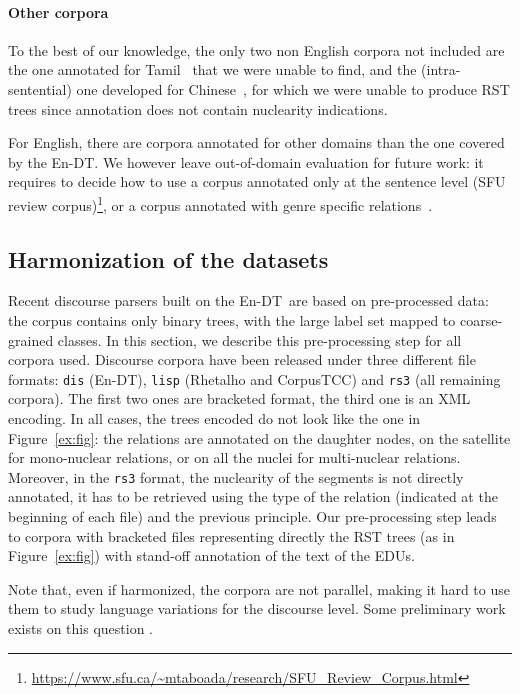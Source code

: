 \documentclass[11pt]{article}
\newcommand{\erstdt}{En-DT}
\begin{document}
\paragraph{Other corpora} 
To the best of our knowledge, the only two non English corpora not included are the one annotated for Tamil~\cite{subalalitha:approach:2012} that we were unable to find, and the (intra-sentential) one developed for Chinese~\cite{wu:new:2016}, for which we were unable to produce RST trees since annotation does not contain nuclearity indications.

For English, there are corpora annotated for other domains than the one covered by the \erstdt.
We however leave out-of-domain evaluation for future work: it requires to decide how to use a corpus annotated only at the sentence level (SFU review corpus)\footnote{\url{https://www.sfu.ca/~mtaboada/research/SFU_Review_Corpus.html}}, or a corpus annotated with genre specific relations~\cite{subba:effective:2009}.


\subsection{Harmonization of the datasets}
\label{subsec:harmonization}

Recent discourse parsers built on the \erstdt\ are based on pre-processed data: the corpus contains only binary trees, with the large label set mapped to  coarse-grained classes. 
In this section, we describe this pre-processing step for all corpora used. 
Discourse corpora have been released under three different file formats: \texttt{dis} (\erstdt), \texttt{lisp} (Rhetalho and CorpusTCC) and \texttt{rs3} (all remaining corpora). The first two ones are bracketed format, the third one is an XML encoding. 
In all cases, the trees encoded do not look like the one in Figure~\ref{ex:fig}: the relations are annotated on the daughter nodes, on the satellite for mono-nuclear relations, or on all the nuclei for multi-nuclear relations. Moreover, in the \texttt{rs3} format, the nuclearity of the segments is not directly annotated, it has to be retrieved using the type of the relation (indicated at the beginning of each file) and the previous principle.
Our pre-processing step leads to corpora with bracketed files representing directly the RST trees (as in Figure~\ref{ex:fig}) with stand-off annotation of the text of the EDUs.

Note that, even if harmonized, the corpora are not parallel, making it hard to use them to study language variations for the discourse level.
Some preliminary work exists on this question \cite{iruskieta:qualitative:2015}.
\end{document}
